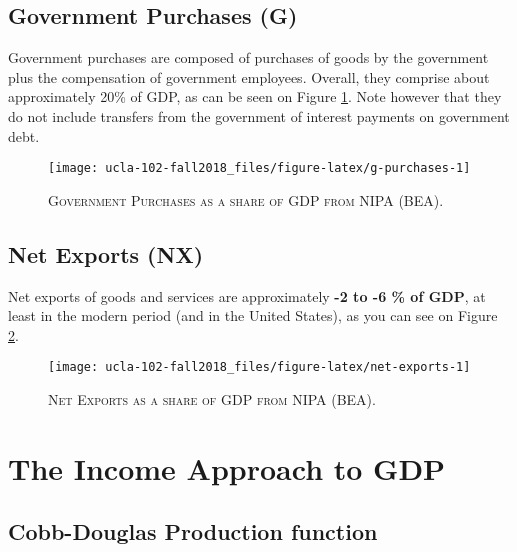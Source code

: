 \documentclass[]{book}
\theoremstyle{definition}
\theoremstyle{definition}
\theoremstyle{definition}
\theoremstyle{remark}
\begin{document}
\hypertarget{gov}{\subsection{Government Purchases (G)}\label{gov}}

Government purchases are composed of purchases of goods by the
government plus the compensation of government employees. Overall, they
comprise about approximately 20\% of GDP, as can be seen on Figure
\ref{fig:g-purchases}. Note however that they do not include transfers
from the government of interest payments on government debt.




\begin{figure}

{\centering \texttt{[image: ucla-102-fall2018\_files/figure-latex/g-purchases-1]} 

}

\caption{\textsc{Government Purchases as a share of GDP
from NIPA (BEA)}.}\label{fig:g-purchases}
\end{figure}

\hypertarget{net-exports}{\subsection{Net Exports
(NX)}\label{net-exports}}

Net exports of goods and services are approximately \textbf{-2 to -6 \%
of GDP}, at least in the modern period (and in the United States), as
you can see on Figure \ref{fig:net-exports}.




\begin{figure}

{\centering \texttt{[image: ucla-102-fall2018\_files/figure-latex/net-exports-1]} 

}

\caption{\textsc{Net Exports as a share of GDP from NIPA
(BEA)}.}\label{fig:net-exports}
\end{figure}

\hypertarget{gdp-income}{\section{The Income Approach to
GDP}\label{gdp-income}}

\subsection{Cobb-Douglas Production
function}\label{cobb-douglas-production-function}
\end{document}
